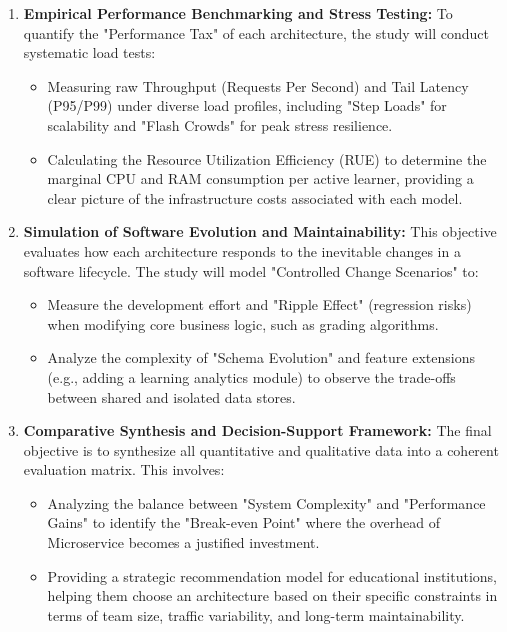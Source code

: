 \begin{enumerate}
\item \textbf{Empirical Performance Benchmarking and Stress Testing:}
To quantify the "Performance Tax" of each architecture, the study will conduct systematic load tests:
\begin{itemize}
    \item Measuring raw Throughput (Requests Per Second) and Tail Latency (P95/P99) under diverse load profiles, including "Step Loads" for scalability and "Flash Crowds" for peak stress resilience.
    \item Calculating the Resource Utilization Efficiency (RUE) to determine the marginal CPU and RAM consumption per active learner, providing a clear picture of the infrastructure costs associated with each model.
\end{itemize}

\item \textbf{Simulation of Software Evolution and Maintainability:}
This objective evaluates how each architecture responds to the inevitable changes in a software lifecycle. The study will model "Controlled Change Scenarios" to:
\begin{itemize}
    \item Measure the development effort and "Ripple Effect" (regression risks) when modifying core business logic, such as grading algorithms.
    \item Analyze the complexity of "Schema Evolution" and feature extensions (e.g., adding a learning analytics module) to observe the trade-offs between shared and isolated data stores.
\end{itemize}

\item \textbf{Comparative Synthesis and Decision-Support Framework:}
The final objective is to synthesize all quantitative and qualitative data into a coherent evaluation matrix. This involves:
\begin{itemize}
    \item Analyzing the balance between "System Complexity" and "Performance Gains" to identify the "Break-even Point" where the overhead of Microservice becomes a justified investment.
    \item Providing a strategic recommendation model for educational institutions, helping them choose an architecture based on their specific constraints in terms of team size, traffic variability, and long-term maintainability.
\end{itemize}
\end{enumerate}


